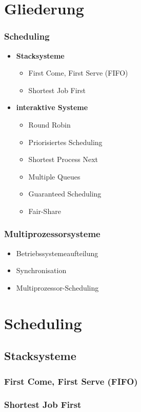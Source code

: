 \section{Gliederung}
\begin{frame}
	\frametitle{Scheduling}
	\begin{itemize}
		\item<1-> \textbf{Stacksysteme}
		\begin{itemize}[<+->]
			\item First Come, First Serve (FIFO)
			\item Shortest Job First
		\end{itemize}
		\item<3-> \textbf{interaktive Systeme}
		\begin{itemize}[<+->]
			\item Round Robin
			\item Priorisiertes Scheduling
			\item Shortest Process Next
			\item Multiple Queues
			\item Guaranteed Scheduling
			\item Fair-Share
		\end{itemize}
	\end{itemize}
\end{frame}

\begin{frame}
	\frametitle{Multiprozessorsysteme}
	\begin{itemize}
		\item Betriebssystemeaufteilung
		\item Synchronisation
		\item Multiprozessor-Scheduling
	\end{itemize}
\end{frame}


\section{Scheduling}
\subsection{Stacksysteme}
\begin{frame}
	\frametitle{First Come, First Serve (FIFO)}
\end{frame}
\begin{frame}
	\frametitle{Shortest Job First}
\end{frame}

